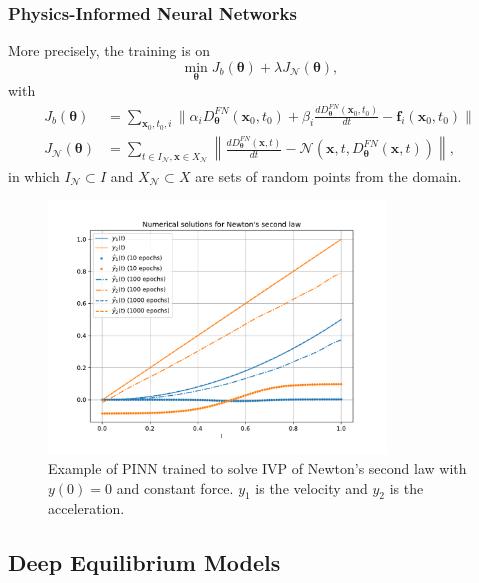 \documentclass[t]{beamer}
\begin{document}
\begin{frame}
    \frametitle{Physics-Informed Neural Networks}
    More precisely, the training is on \[
	\min_{\bm{\theta}} J_b\left( \bm{\theta} \right) + \lambda J_{\mathcal{N}}\left( \bm{\theta} \right)
    ,\] with
    \begin{align*}
	J_b\left( \bm{\theta} \right) &= \sum_{\bm{x}_0,t_0,i} \|\alpha_iD^{FN}_{\bm{\theta}}\left( \bm{x}_0,t_0 \right) + \beta_i \frac{d D^{FN}_{\bm{\theta}}\left( \bm{x}_0,t_0 \right) }{d t} - \bm{f}_i\left( \bm{x}_0,t_0 \right)\| \\
	J_{\mathcal{N}}\left( \bm{\theta} \right) &= \sum_{t \in I_{\mathcal{N}},\bm{x}\in X_{\mathcal{N}}} \left\| \frac{d D^{FN}_{\bm{\theta}}\left( \bm{x}, t \right) }{dt} - \mathcal{N}\left( \bm{x}, t,D^{FN}_{\bm{\theta}}\left( \bm{x}, t \right)  \right)  \right\|
    ,\end{align*}
    in which $I_{\mathcal{N}}\subset I$ and $X_{\mathcal{N}}\subset X$ are sets of random points from the domain.
\end{frame}

\begin{frame}
    \begin{figure}[h]
        \centering
        \includegraphics[width=0.8\textwidth]{../images/pinn_newton.pdf}
        \caption{Example of PINN trained to solve IVP of Newton's second law with $y(0)=0$ and constant force. $y_1$ is the velocity and $y_2$ is the acceleration.}
        \label{fig:-images-pinn_newton-pdf}
    \end{figure}
\end{frame}

\subsection{Deep Equilibrium Models}
\end{document}
